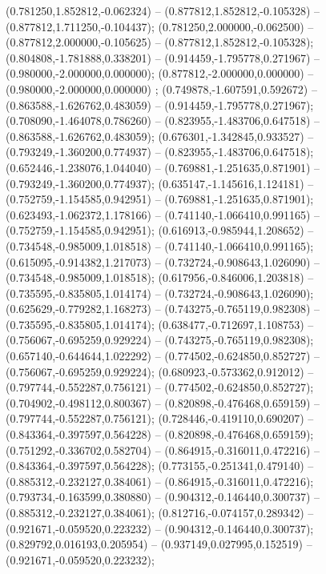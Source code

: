  (0.781250,1.852812,-0.062324) -- (0.877812,1.852812,-0.105328) -- (0.877812,1.711250,-0.104437);
 (0.781250,2.000000,-0.062500) -- (0.877812,2.000000,-0.105625) -- (0.877812,1.852812,-0.105328);
 (0.804808,-1.781888,0.338201) -- (0.914459,-1.795778,0.271967) -- (0.980000,-2.000000,0.000000);
 (0.877812,-2.000000,0.000000) -- (0.980000,-2.000000,0.000000) ;
 (0.749878,-1.607591,0.592672) -- (0.863588,-1.626762,0.483059) -- (0.914459,-1.795778,0.271967);
 (0.708090,-1.464078,0.786260) -- (0.823955,-1.483706,0.647518) -- (0.863588,-1.626762,0.483059);
 (0.676301,-1.342845,0.933527) -- (0.793249,-1.360200,0.774937) -- (0.823955,-1.483706,0.647518);
 (0.652446,-1.238076,1.044040) -- (0.769881,-1.251635,0.871901) -- (0.793249,-1.360200,0.774937);
 (0.635147,-1.145616,1.124181) -- (0.752759,-1.154585,0.942951) -- (0.769881,-1.251635,0.871901);
 (0.623493,-1.062372,1.178166) -- (0.741140,-1.066410,0.991165) -- (0.752759,-1.154585,0.942951);
 (0.616913,-0.985944,1.208652) -- (0.734548,-0.985009,1.018518) -- (0.741140,-1.066410,0.991165);
 (0.615095,-0.914382,1.217073) -- (0.732724,-0.908643,1.026090) -- (0.734548,-0.985009,1.018518);
 (0.617956,-0.846006,1.203818) -- (0.735595,-0.835805,1.014174) -- (0.732724,-0.908643,1.026090);
 (0.625629,-0.779282,1.168273) -- (0.743275,-0.765119,0.982308) -- (0.735595,-0.835805,1.014174);
 (0.638477,-0.712697,1.108753) -- (0.756067,-0.695259,0.929224) -- (0.743275,-0.765119,0.982308);
 (0.657140,-0.644644,1.022292) -- (0.774502,-0.624850,0.852727) -- (0.756067,-0.695259,0.929224);
 (0.680923,-0.573362,0.912012) -- (0.797744,-0.552287,0.756121) -- (0.774502,-0.624850,0.852727);
 (0.704902,-0.498112,0.800367) -- (0.820898,-0.476468,0.659159) -- (0.797744,-0.552287,0.756121);
 (0.728446,-0.419110,0.690207) -- (0.843364,-0.397597,0.564228) -- (0.820898,-0.476468,0.659159);
 (0.751292,-0.336702,0.582704) -- (0.864915,-0.316011,0.472216) -- (0.843364,-0.397597,0.564228);
 (0.773155,-0.251341,0.479140) -- (0.885312,-0.232127,0.384061) -- (0.864915,-0.316011,0.472216);
 (0.793734,-0.163599,0.380880) -- (0.904312,-0.146440,0.300737) -- (0.885312,-0.232127,0.384061);
 (0.812716,-0.074157,0.289342) -- (0.921671,-0.059520,0.223232) -- (0.904312,-0.146440,0.300737);
 (0.829792,0.016193,0.205954) -- (0.937149,0.027995,0.152519) -- (0.921671,-0.059520,0.223232);
